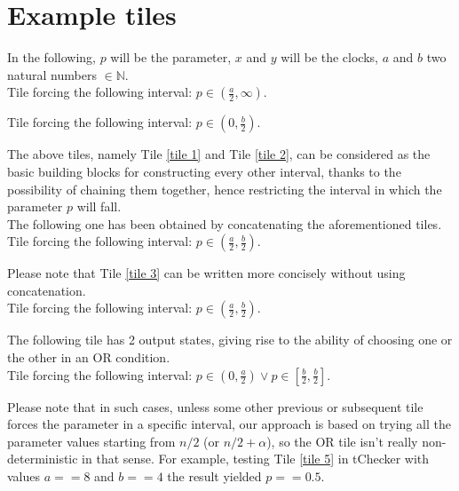 \documentclass[12pt, a4paper]{article}
\begin{document}

\section{Example tiles}

\noindent
In the following, $p$ will be the parameter, $x$ and $y$ will be the clocks, $a$ and $b$ two natural numbers $\in \mathbb{N}$.\\

Tile forcing the following interval: $p \in (\frac{a}{2}, \infty)$.



\bigskip

Tile forcing the following interval: $p \in (0, \frac{b}{2})$.



\noindent
The above tiles, namely Tile \ref{tile 1} and Tile \ref{tile 2}, can be considered as the basic building blocks for constructing every other interval, thanks to the possibility of chaining them together, hence restricting the interval in which the parameter $p$ will fall.\\

\noindent
The following one has been obtained by concatenating the aforementioned tiles.\\

Tile forcing the following interval: $p \in (\frac{a}{2}, \frac{b}{2})$.



\noindent
Please note that Tile \ref{tile 3} can be written more concisely without using concatenation.\\

Tile forcing the following interval: $p \in (\frac{a}{2}, \frac{b}{2})$.



\newpage

\noindent
The following tile has 2 output states, giving rise to the ability of choosing one or the other in an OR condition.\\

Tile forcing the following interval: $p \in (0, \frac{a}{2}) \vee p \in [\frac{b}{2}, \frac{b}{2}]$.



\noindent
Please note that in such cases, unless some other previous or subsequent tile forces the parameter in a specific interval, our approach is based on trying all the parameter values starting from $n /2$ (or $n / 2 + \alpha$), so the OR tile isn't really non-deterministic in that sense. For example, testing Tile \ref{tile 5} in tChecker with values $a == 8$ and $b == 4$ the result yielded $p == 0.5$.\\
\end{document}
